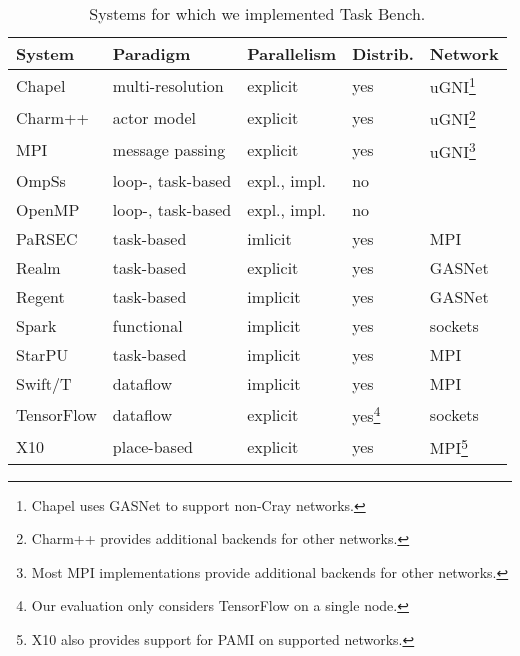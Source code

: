 \begin{table}[t]
\begin{tabular}{l | l | l | l | l}
System & Paradigm & Parallelism & Distrib. & Network \\
\hline
Chapel & multi-resolution & explicit & yes & uGNI\footnote{Chapel uses GASNet to support non-Cray networks.} \\
Charm++ & actor model & explicit & yes & uGNI\footnote{Charm++ provides additional backends for other networks.} \\
MPI & message passing & explicit & yes & uGNI\footnote{Most MPI implementations provide additional backends for other networks.} \\
OmpSs & loop-, task-based & expl., impl. & no & \\
OpenMP & loop-, task-based & expl., impl. & no & \\
PaRSEC & task-based & imlicit & yes & MPI \\
Realm & task-based & explicit & yes & GASNet \\
Regent & task-based & implicit & yes & GASNet \\
Spark & functional & implicit & yes & sockets \\
StarPU & task-based & implicit & yes & MPI \\
Swift/T & dataflow & implicit & yes & MPI \\
TensorFlow & dataflow & explicit & yes\footnote{Our evaluation only considers TensorFlow on a single node.} & sockets \\
X10 & place-based & explicit & yes & MPI\footnote{X10 also provides support for PAMI on supported networks.}
\end{tabular}

\caption{Systems for which we implemented Task Bench.\label{tab:systems}}
\end{table}
